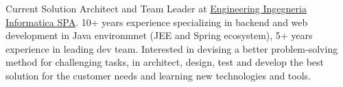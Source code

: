 

\begin{cvparagraph}

Current Solution Architect and Team Leader at \href{http://www.eng.it}{Engineering Ingegneria Informatica SPA}. 10+ years experience specializing in backend and web development in Java environmnet (JEE and Spring ecosystem), 5+ years experience in leading dev team. Interested in devising a better problem-solving method for challenging tasks, in architect, design, test and develop the best solution for the customer needs and learning new technologies and tools.
\end{cvparagraph}
